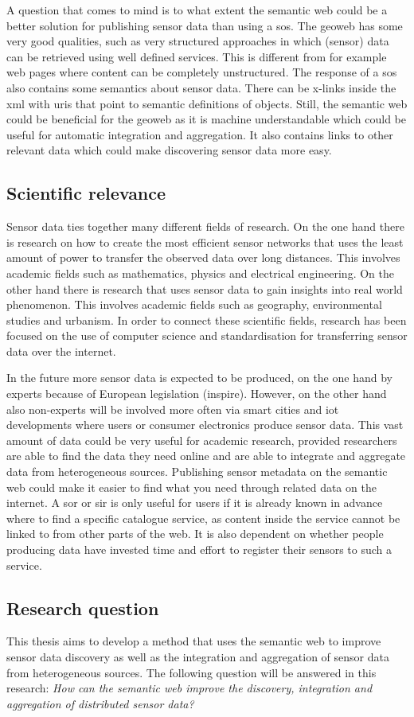 A question that comes to mind is to what extent the semantic web could be a better solution for publishing sensor data than using a \ac{sos}. The geoweb has some very good qualities, such as very structured approaches in which (sensor) data can be retrieved using well defined services. This is different from for example web pages where content can be completely unstructured. The response of a \ac{sos} also contains some semantics about sensor data. There can be x-links inside the \ac{xml} with \ac{uri}s that point to semantic definitions of objects. Still, the semantic web could be beneficial for the geoweb as it is machine understandable which could be useful for automatic integration and aggregation. It also contains links to other relevant data which could make discovering sensor data more easy. 

\subsection{Scientific relevance}
Sensor data ties together many different fields of research. On the one hand there is research on how to create the most efficient sensor networks that uses the least amount of power to transfer the observed data over long distances. This involves academic fields such as mathematics, physics and electrical engineering. On the other hand there is research that uses sensor data to gain insights into real world phenomenon. This involves academic fields such as geography, environmental studies and urbanism. In order to connect these scientific fields, research has been focused on the use of computer science and standardisation for transferring sensor data over the internet. 

In the future more sensor data is expected to be produced, on the one hand by experts because of European legislation (\ac{inspire}). However, on the other hand also non-experts will be involved more often via smart cities and \ac{iot} developments where users or consumer electronics produce sensor data. This vast amount of data could be very useful for academic research, provided researchers are able to find the data they need online and are able to integrate and aggregate data from heterogeneous sources. Publishing sensor metadata on the semantic web could make it easier to find what you need through related data on the internet. A \ac{sor} or \ac{sir} is only useful for users if it is already known in advance where to find a specific catalogue service, as content inside the service cannot be linked to from other parts of the web. It is also dependent on whether people producing data have invested time and effort to register their sensors to such a service.      

\subsection{Research question}
This thesis aims to develop a method that uses the semantic web to improve sensor data discovery as well as the integration and aggregation of sensor data from heterogeneous sources. The following question will be answered in this research:   
\textit{How can the semantic web improve the discovery, integration and aggregation of distributed sensor data?} 
